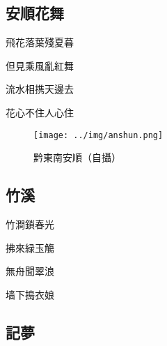 \documentclass[a4j,12pt]{ltjtarticle}
\begin{document}
\begin{center}
	\newpage
	
	\begin{flushleft}
		\section{安順花舞} 
	\end{flushleft}	
	
	
	\vfill
	\LARGE 	飛花落葉殘夏暮\par
	但見乘風亂紅舞 \par
	流水相携天邊去 \par
	花心不住人心住 
	\vfill
	
	
	\newpage
	\vspace{3cm}
	\vfill
	\begin{figure}[h!]
		\centering
		\texttt{[image: ../img/anshun.png]}
		\caption{黔東南安順（自攝）}
		\label{fig:zhenwu}
	\end{figure}
	\vfill
	
	\newpage
	
	\begin{flushleft}
		\section{竹溪} 
	\end{flushleft}	
	
	\vfill
	\LARGE 	竹澗鎖春光\par
	拂來緑玉觴 \par
	無舟聞翠浪 \par
	墙下搗衣娘 \par
	\vfill
	
	
	
	
	\newpage
	
	\begin{flushleft}
		\section{記夢} 
	\end{flushleft}	
	

\end{center}
\end{document}
